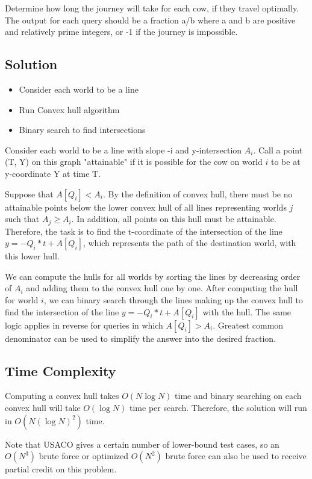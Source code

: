 \documentclass{article}
\begin{document}
Determine how long the journey will take for each cow, if they travel optimally. The output for each query should be a fraction a/b where a and b are positive and relatively prime integers, or -1 if the journey is impossible.

\subsection{Solution}

\begin{itemize}
    \item Consider each world to be a line
    \item Run Convex hull algorithm
    \item Binary search to find intersections
\end{itemize}

Consider each world to be a line with slope -i and y-intersection $A_i$. Call a point (T, Y) on this graph "attainable" if it is possible for the cow on world $i$ to be at y-coordinate Y at time T. 

Suppose that $A[Q_i] < A_i$. By the definition of convex hull, there must be no attainable points below the lower convex hull of all lines representing worlds $j$ such that $A_j \geq A_i$. In addition, all points on this hull must be attainable. Therefore, the task is to find the t-coordinate of the intersection of the line $y=-Q_i*t+A[Q_i]$, which represents the path of the destination world, with this lower hull. 

We can compute the hulls for all worlds by sorting the lines by decreasing order of $A_i$ and adding them to the convex hull one by one. After computing the hull for world $i$, we can binary search through the lines making up the convex hull to find the intersection of the line $y=-Q_i*t+A[Q_i]$ with the hull. The same logic applies in reverse for queries in which $A[Q_i] > A_i$. Greatest common denominator can be used to simplify the answer into the desired fraction.

\subsection{Time Complexity}

Computing a convex hull takes $O(N\log{N})$ time and binary searching on each convex hull will take $O(\log{N})$ time per search. Therefore, the solution will run in $O(N(\log{N})^2)$ time.

Note that USACO gives a certain number of lower-bound test cases, so an $O(N^3)$ brute force or optimized $O(N^2)$ brute force can also be used to receive partial credit on this problem.
\end{document}
